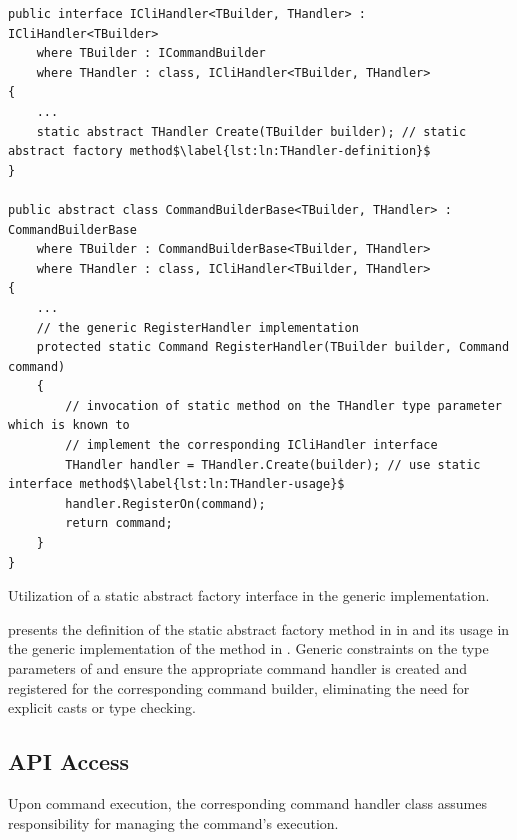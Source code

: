 \begin{listing}[H]
\begin{verbatim}
public interface ICliHandler<TBuilder, THandler> : ICliHandler<TBuilder>
    where TBuilder : ICommandBuilder 
    where THandler : class, ICliHandler<TBuilder, THandler> 
{
    ...
    static abstract THandler Create(TBuilder builder); // static abstract factory method$\label{lst:ln:THandler-definition}$
}

public abstract class CommandBuilderBase<TBuilder, THandler> : CommandBuilderBase
    where TBuilder : CommandBuilderBase<TBuilder, THandler>
    where THandler : class, ICliHandler<TBuilder, THandler>
{
    ...
    // the generic RegisterHandler implementation
    protected static Command RegisterHandler(TBuilder builder, Command command)
    {
        // invocation of static method on the THandler type parameter which is known to 
        // implement the corresponding ICliHandler interface
        THandler handler = THandler.Create(builder); // use static interface method$\label{lst:ln:THandler-usage}$
        handler.RegisterOn(command);
        return command;
    }
}
\end{verbatim}
\vspace{-.25cm}
\caption{Utilization of a static abstract factory interface in the generic  implementation.}
\vspace{-.25cm}
\label{lst:command-builder-static-abstract-interface-members}
\end{listing}

 presents the definition of the static abstract factory method in  in  and its usage in the generic implementation of the  method in . Generic constraints on the type parameters of  and  ensure the appropriate command handler is created and registered for the corresponding command builder, eliminating the need for explicit casts or type checking.

\subsection{API Access}\label{sec:cs-api-access}

Upon command execution, the corresponding command handler class assumes responsibility for managing the command's execution.

